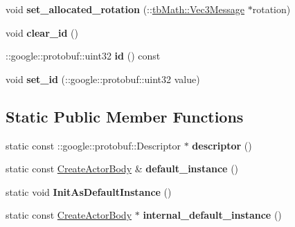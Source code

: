\begin{DoxyCompactItemize}
\mbox{\label{classtbBasics_1_1CreateActorBody_a67038cb5defb4f008be5273f526b0544}} 
void {\bfseries set\+\_\+allocated\+\_\+rotation} (\+::\hyperlink{classtbMath_1_1Vec3Message}{tb\+Math\+::\+Vec3\+Message} $\ast$rotation)
\item 
\mbox{\label{classtbBasics_1_1CreateActorBody_a4dc1c1bff6cfad646cc5722d5d42747a}} 
void {\bfseries clear\+\_\+id} ()
\item 
\mbox{\label{classtbBasics_1_1CreateActorBody_a19b7cc338fb743e7838440ad1c753a3b}} 
\+::google\+::protobuf\+::uint32 {\bfseries id} () const
\item 
\mbox{\label{classtbBasics_1_1CreateActorBody_aa0b707761b9d7864dfdc9ba6de6c86cd}} 
void {\bfseries set\+\_\+id} (\+::google\+::protobuf\+::uint32 value)
\end{DoxyCompactItemize}
\subsection*{Static Public Member Functions}
\begin{DoxyCompactItemize}
\item 
\mbox{\label{classtbBasics_1_1CreateActorBody_a81ae0391f4244c31da403e2a2e8b6c32}} 
static const \+::google\+::protobuf\+::\+Descriptor $\ast$ {\bfseries descriptor} ()
\item 
\mbox{\label{classtbBasics_1_1CreateActorBody_a9c8744867212ca3d126d1e48573cbdb6}} 
static const \hyperlink{classtbBasics_1_1CreateActorBody}{Create\+Actor\+Body} \& {\bfseries default\+\_\+instance} ()
\item 
\mbox{\label{classtbBasics_1_1CreateActorBody_a435b501601da8f5227cbba141d727f77}} 
static void {\bfseries Init\+As\+Default\+Instance} ()
\item 
\mbox{\label{classtbBasics_1_1CreateActorBody_ae0e50a5444e6f43239575fbbb5c3040d}} 
static const \hyperlink{classtbBasics_1_1CreateActorBody}{Create\+Actor\+Body} $\ast$ {\bfseries internal\+\_\+default\+\_\+instance} ()
\end{DoxyCompactItemize}
